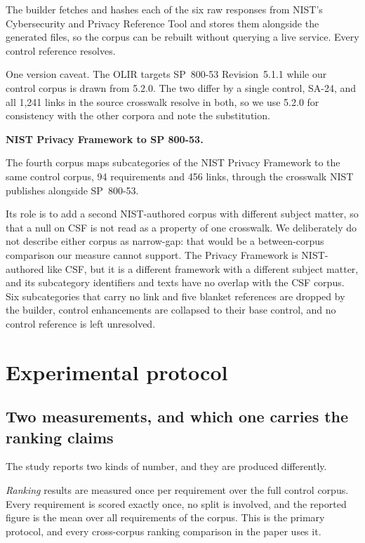 \documentclass[smallextended,natbib]{svjour3}
\begin{document}
The builder fetches and hashes each of the six raw responses from NIST's Cybersecurity and Privacy Reference Tool and stores them alongside the generated files, so the corpus can be rebuilt without querying a live service. Every control reference resolves.

One version caveat. The OLIR targets SP~800-53 Revision~5.1.1 while our control corpus is drawn from 5.2.0. The two differ by a single control, SA-24, and all 1{,}241 links in the source crosswalk resolve in both, so we use 5.2.0 for consistency with the other corpora and note the substitution.

\noindent\textbf{NIST Privacy Framework to SP 800-53.}
\label{sec:dataset-pf}

The fourth corpus maps subcategories of the NIST Privacy Framework to the same control corpus, 94 requirements and 456 links, through the crosswalk NIST publishes alongside SP~800-53.

Its role is to add a second NIST-authored corpus with different subject matter, so that a null on CSF is not read as a property of one crosswalk. We deliberately do not describe either corpus as narrow-gap: that would be a between-corpus comparison our measure cannot support. The Privacy Framework is NIST-authored like CSF, but it is a different framework with a different subject matter, and its subcategory identifiers and texts have no overlap with the CSF corpus. Six subcategories that carry no link and five blanket references are dropped by the builder, control enhancements are collapsed to their base control, and no control reference is left unresolved.


\section{Experimental protocol}
\label{sec:protocol}

\subsection{Two measurements, and which one carries the ranking claims}
\label{sec:protocol-estimands}

The study reports two kinds of number, and they are produced differently.

\emph{Ranking} results are measured once per requirement over the full control corpus. Every requirement is scored exactly once, no split is involved, and the reported figure is the mean over all requirements of the corpus. This is the primary protocol, and every cross-corpus ranking comparison in the paper uses it.
\end{document}
